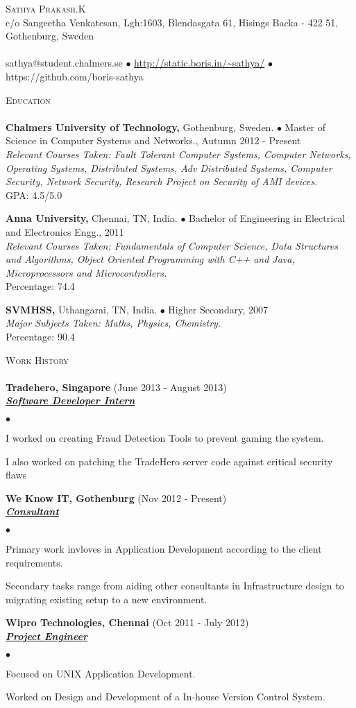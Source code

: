 \documentclass{article}
\newcommand{\lineunder}{\vspace*{-8pt} \\ \hspace*{-18pt} \hrulefill \\}
\newcommand{\header}[1]{{\hspace*{-15pt}\vspace*{6pt} \textsc{#1}} \vspace*{-6pt} \lineunder}
\newcommand{\employer}[3]{{ \textbf{#1} (#2)\\ \underline{\textbf{\emph{#3}}}\\  }}
\newcommand{\contact}[3]{
\vspace*{-8pt}
\begin{center}
{\LARGE \scshape {#1}}\\
#2 \lineunder
#3
\end{center}
\vspace*{-8pt}
}
\newenvironment{achievements}{\begin{list}{$\bullet$}{\topsep 0pt \itemsep -2pt}}{\vspace*{4pt}\end{list}}
\newcommand{\schoolwithcourses}[5]{
 \textbf{#1} #2 $\bullet$ #3\\
 \textit{#4} \\
#5 \\
\vspace*{5pt}
}
\begin{document}
\small
\smallskip
\vspace*{-44pt}

\contact{Sathya Prakash.K}
{c/o Sangeetha Venkatesan, Lgh:1603, Blendasgata 61, Hisings Backa - 422 51, Gothenburg, Sweden}
{sathya@student.chalmers.se  $\bullet$ \url{http://static.boris.in/~sathya/} $\bullet$ https://github.com/boris-sathya}

\header{Education}

\schoolwithcourses{Chalmers University of Technology,} {Gothenburg, Sweden.}{Master of Science in Computer Systems and Networks., Autumn 2012 - Present}{Relevant Courses Taken: Fault Tolerant Computer Systems, Computer Networks, Operating Systems, Distributed Systems, Adv Distributed Systems, Computer Security, Network Security, Research Project on Security of AMI devices. }{GPA: 4.5/5.0}

\schoolwithcourses{Anna University,}{Chennai, TN, India.}{Bachelor of Engineering in Electrical and Electronics Engg., 2011}
{Relevant Courses Taken: Fundamentals of Computer Science, Data Structures and Algorithms, Object Oriented Programming with C++ and Java, Microprocessors and Microcontrollers.}
{Percentage: 74.4}

\schoolwithcourses{SVMHSS,}{Uthangarai, TN, India.}{Higher Secondary, 2007}
{Major Subjects Taken: Maths, Physics, Chemistry.}
{Percentage: 90.4}

\header{Work History}

\employer{Tradehero, Singapore}{June 2013 - August 2013}{Software Developer Intern}
    \begin{achievements}
    \item I worked on creating Fraud Detection Tools to prevent gaming the system.
    \item I also worked on patching the TradeHero server code against critical security flaws
    \end{achievements}
	
\employer{We Know IT, Gothenburg}{Nov 2012 - Present}{Consultant}
    \begin{achievements}
    \item Primary work invloves in Application Development according to the client requirements.
	\item Secondary tasks range from aiding other consultants in Infrastructure design to migrating existing setup to a new environment. 
    \end{achievements}

\employer{Wipro Technologies, Chennai}{Oct 2011 - July 2012}{Project Engineer}
    \begin{achievements}
    \item Focused on UNIX Application Development.
    \item Worked on Design and Development of a In-house Version Control System.
    \end{achievements}
\end{document}
